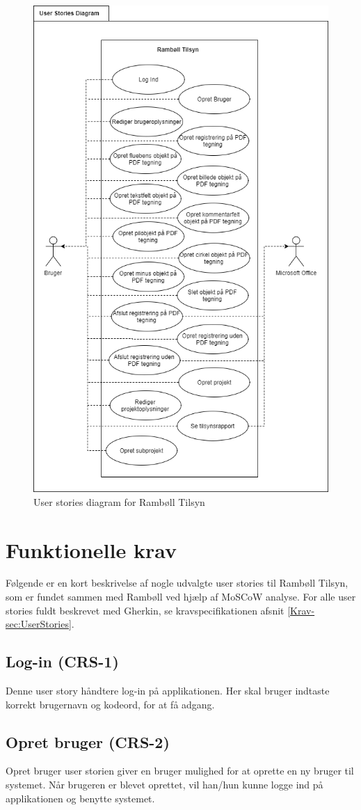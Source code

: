 	\begin{figure}[H]
		\centering
		\includegraphics[width=0.6\linewidth]{Kravspecifikation/UserStorieDiagram}
		\caption{User stories diagram for Rambøll Tilsyn}
		\label{fig:Userstoriediagram}
	\end{figure}
	
	\clearpage
	
\section{Funktionelle krav} 
	Følgende er en kort beskrivelse af nogle udvalgte user stories til Rambøll Tilsyn, som er fundet sammen med Rambøll ved hjælp af MoSCoW analyse. \cite{MoSCoW} For alle user stories fuldt beskrevet med Gherkin, se kravspecifikationen afsnit \ref{Krav-sec:UserStories}.

	\subsection*{Log-in (CRS-1)}
	Denne user story håndtere log-in på applikationen. Her skal bruger indtaste korrekt brugernavn og kodeord, for at få adgang.
	
	\subsection*{Opret bruger (CRS-2)}
	Opret bruger user storien giver en bruger mulighed for at oprette en ny bruger til systemet. Når brugeren er blevet oprettet, vil han/hun kunne logge ind på applikationen og benytte systemet.
	
